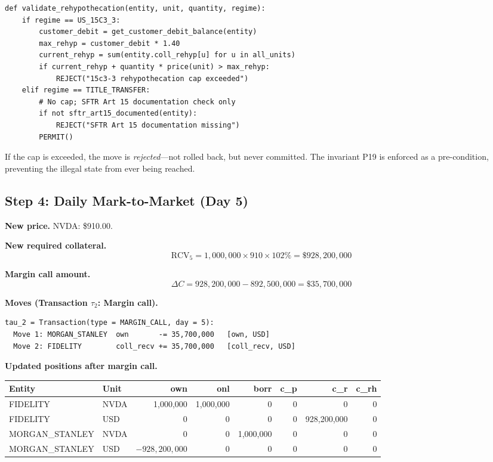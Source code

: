\documentclass[11pt,a4paper]{article}
\begin{document}
\begin{lstlisting}
def validate_rehypothecation(entity, unit, quantity, regime):
    if regime == US_15C3_3:
        customer_debit = get_customer_debit_balance(entity)
        max_rehyp = customer_debit * 1.40
        current_rehyp = sum(entity.coll_rehyp[u] for u in all_units)
        if current_rehyp + quantity * price(unit) > max_rehyp:
            REJECT("15c3-3 rehypothecation cap exceeded")
    elif regime == TITLE_TRANSFER:
        # No cap; SFTR Art 15 documentation check only
        if not sftr_art15_documented(entity):
            REJECT("SFTR Art 15 documentation missing")
        PERMIT()
\end{lstlisting}

\noindent If the cap is exceeded, the move is \emph{rejected}---not rolled back, but never committed. The invariant P19 is enforced as a pre-condition, preventing the illegal state from ever being reached.

\subsection{Step 4: Daily Mark-to-Market (Day 5)}
\label{sec:us-step4}

\noindent\textbf{New price.} NVDA: \$910.00.

\medskip
\noindent\textbf{New required collateral.}
\[
\mathrm{RCV}_5 = 1{,}000{,}000 \times 910 \times 102\% = \$928{,}200{,}000
\]

\noindent\textbf{Margin call amount.}
\[
\Delta C = 928{,}200{,}000 - 892{,}500{,}000 = \$35{,}700{,}000
\]

\medskip
\noindent\textbf{Moves (Transaction $\tau_2$: Margin call).}

\begin{lstlisting}
tau_2 = Transaction(type = MARGIN_CALL, day = 5):
  Move 1: MORGAN_STANLEY  own       -= 35,700,000   [own, USD]
  Move 2: FIDELITY        coll_recv += 35,700,000   [coll_recv, USD]
\end{lstlisting}

\medskip
\noindent\textbf{Updated positions after margin call.}

\begin{center}\small
\begin{tabular}{l l r r r r r r}
\toprule
\textbf{Entity} & \textbf{Unit} & own & onl & borr & c\_p & c\_r & c\_rh \\
\midrule
FIDELITY & NVDA & 1{,}000{,}000 & 1{,}000{,}000 & 0 & 0 & 0 & 0 \\
FIDELITY & USD & 0 & 0 & 0 & 0 & 928{,}200{,}000 & 0 \\
\midrule
MORGAN\_STANLEY & NVDA & 0 & 0 & 1{,}000{,}000 & 0 & 0 & 0 \\
MORGAN\_STANLEY & USD & $-928{,}200{,}000$ & 0 & 0 & 0 & 0 & 0 \\
\bottomrule
\end{tabular}
\end{center}
\end{document}
